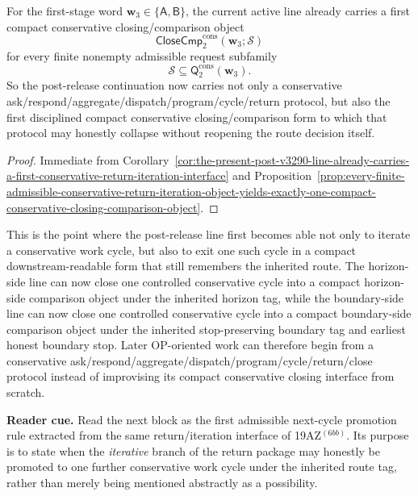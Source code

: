 \begin{corollary}
\label{cor:the-present-post-v3290-line-already-carries-a-first-compact-conservative-closing-comparison-form}
For the first-stage word \(\mathbf w_3\in\{\mathsf A,\mathsf B\}\), the current active line already carries a first compact conservative closing/comparison object
\[
 \mathsf{CloseCmp}^{\mathrm{cons}}_{2}(\mathbf w_3;\mathcal S)
\]
for every finite nonempty admissible request subfamily
\[
 \mathcal S\subseteq \mathsf{Q}^{\mathrm{cons}}_{2}(\mathbf w_3).
\]
So the post-release continuation now carries not only a conservative ask/respond/aggregate/dispatch/program/cycle/return protocol, but also the first disciplined compact conservative closing/comparison form to which that protocol may honestly collapse without reopening the route decision itself.
\end{corollary}

\begin{proof}
Immediate from Corollary~\ref{cor:the-present-post-v3290-line-already-carries-a-first-conservative-return-iteration-interface} and Proposition~\ref{prop:every-finite-admissible-conservative-return-iteration-object-yields-exactly-one-compact-conservative-closing-comparison-object}.
\end{proof}

\begin{remark}
\label{rem:what-the-first-compact-conservative-closing-comparison-form-now-buys}
This is the point where the post-release line first becomes able not only to iterate a conservative work cycle, but also to exit one such cycle in a compact downstream-readable form that still remembers the inherited route. The horizon-side line can now close one controlled conservative cycle into a compact horizon-side comparison object under the inherited horizon tag, while the boundary-side line can now close one controlled conservative cycle into a compact boundary-side comparison object under the inherited stop-preserving boundary tag and earliest honest boundary stop. Later OP-oriented work can therefore begin from a conservative ask/respond/aggregate/dispatch/program/cycle/return/close protocol instead of improvising its compact conservative closing interface from scratch.
\end{remark}


\noindent\textbf{Reader cue.} Read the next block as the first admissible next-cycle promotion rule extracted from the same return/iteration interface of 19AZ$^{(6bb)}$. Its purpose is to state when the \emph{iterative} branch of the return package may honestly be promoted to one further conservative work cycle under the inherited route tag, rather than merely being mentioned abstractly as a possibility.

